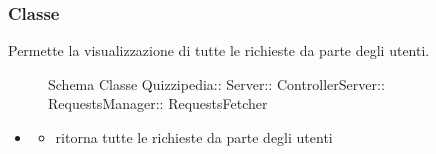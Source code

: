 \subsubsection{Classe }
Permette la visualizzazione di tutte le richieste da parte degli utenti.
\begin{figure}[H]
\centering
\noindent{}
\caption[Schema Classe RequestsFetcher]{Schema Classe Quizzipedia:: Server:: ControllerServer:: RequestsManager:: RequestsFetcher}
\end{figure}
\begin{itemize}
\item {}
\begin{itemize}
\item {}
\newline
ritorna tutte le richieste da parte degli utenti
\newline
\end{itemize}
\end{itemize}
